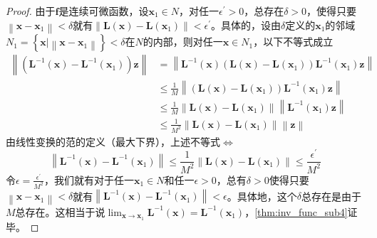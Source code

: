\documentclass[../main.tex]{subfiles}
\begin{document}
\begin{proof}
    由于$\mathbf{f}$是连续可微函数，设$\mathbf{x}_1\in N$，对任一$\epsilon^\prime>0$，总存在$\delta>0$，使得只要$\left\|\mathbf{x}-\mathbf{x}_1\right\|<\delta$就有$\left\|\mathbf{L}\left(\mathbf{x}\right)-\mathbf{L}\left(\mathbf{x}_1\right)\right\|<\epsilon^\prime$。具体的，设由$\delta$定义的$\mathbf{x}_1$的邻域$N_1=\left\{\mathbf{x}|\left\|\mathbf{x}-\mathbf{x}_1\right\|\right\}<\delta$在$N$的内部，则对任一$\mathbf{x}\in N_1$，以下不等式成立
    \begin{align*}
        \left\|\left(\mathbf{L}^{-1}\left(\mathbf{x}\right)-\mathbf{L}^{-1}\left(\mathbf{x}_1\right)\right)\mathbf{z}\right\| & =\left\|\mathbf{L}^{-1}\left(\mathbf{x}\right)\left(\mathbf{L}\left(\mathbf{x}\right)-\mathbf{L}\left(\mathbf{x}_1\right)\right)\mathbf{L}^{-1}\left(\mathbf{x}_1\right)\mathbf{z}\right\| \\
                                                                                                                              & \leq\frac{1}{M}\left\|\left(\mathbf{L}\left(\mathbf{x}\right)-\mathbf{L}\left(\mathbf{x}_1\right)\right)\mathbf{L}^{-1}\left(\mathbf{x}_1\right)\mathbf{z}\right\|                         \\
                                                                                                                              & \leq\frac{1}{M}\left\|\mathbf{L}\left(\mathbf{x}\right)-\mathbf{L}\left(\mathbf{x}_1\right)\right\|\left\|\mathbf{L}^{-1}\left(\mathbf{x}_1\right)\mathbf{z}\right\|                       \\
                                                                                                                              & \leq\frac{1}{M^2}\left\|\mathbf{L}\left(\mathbf{x}\right)-\mathbf{L}\left(\mathbf{x}_1\right)\right\|\left\|\mathbf{z}\right\|
    \end{align*}
    由线性变换的范的定义（最大下界），上述不等式$\Leftrightarrow$
    \[\left\|\mathbf{L}^{-1}\left(\mathbf{x}\right)-\mathbf{L}^{-1}\left(\mathbf{x}_1\right)\right\|\leq\frac{1}{M^2}\left\|\mathbf{L}\left(\mathbf{x}\right)-\mathbf{L}\left(\mathbf{x}_1\right)\right\|\leq\frac{\epsilon^\prime}{M^2}\]
    令$\epsilon=\frac{\epsilon^\prime}{M^2}$，我们就有对于任一$\mathbf{x}_1\in N$和任一$\epsilon>0$，总有$\delta>0$使得只要$\left\|\mathbf{x}-\mathbf{x}_1\right\|<\delta$就有$\left\|\mathbf{L}^{-1}\left(\mathbf{x}\right)-\mathbf{L}^{-1}\left(\mathbf{x}_1\right)\right\|<\epsilon$。具体地，这个$\delta$总存在是由于$M$总存在。这相当于说$\lim_{\mathbf{x}\to\mathbf{x}_1}\mathbf{L}^{-1}\left(\mathbf{x}\right)=\mathbf{L}^{-1}\left(\mathbf{x}_1\right)$，\ref{thm:inv_func_sub4}证毕。
\end{proof}
\end{document}
